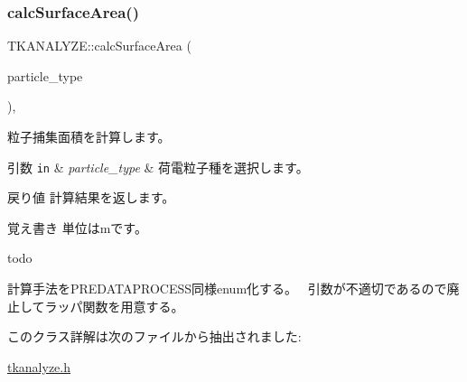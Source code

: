 \subsubsection{\texorpdfstring{calc\+Surface\+Area()}{calcSurfaceArea()}}
{\footnotesize\ttfamily T\+K\+A\+N\+A\+L\+Y\+Z\+E\+::calc\+Surface\+Area (\begin{DoxyParamCaption}\item[{T\+K\+Charged\+Particle\+Type}]{particle\+\_\+type }\end{DoxyParamCaption})\hspace{0.3cm}{\ttfamily [inline]}, {\ttfamily [protected]}}

粒子捕集面積を計算します。 
\begin{DoxyParams}[1]{引数}
\mbox{\tt in}  & {\em particle\+\_\+type} & 荷電粒子種を選択します。 \\
\hline
\end{DoxyParams}
\begin{DoxyReturn}{戻り値}
計算結果を返します。 
\end{DoxyReturn}
\begin{DoxyNote}{覚え書き}
単位はmです。 
\end{DoxyNote}
\begin{DoxyRefDesc}{todo}
\item[\hyperlink{todo__todo000004}{todo}]計算手法を\+P\+R\+E\+D\+A\+T\+A\+P\+R\+O\+C\+E\+S\+S同様enum化する。~\newline
 引数が不適切であるので廃止してラッパ関数を用意する。 \end{DoxyRefDesc}


このクラス詳解は次のファイルから抽出されました\+:\begin{DoxyCompactItemize}
\item 
\hyperlink{tkanalyze_8h}{tkanalyze.\+h}\end{DoxyCompactItemize}
